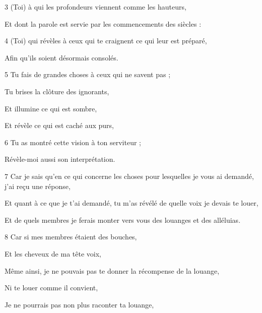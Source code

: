 \par 3 (Toi) à qui les profondeurs viennent comme les hauteurs,

\par Et dont la parole est servie par les commencements des siècles :

\par 4 (Toi) qui révèles à ceux qui te craignent ce qui leur est préparé,

\par Afin qu'ils soient désormais consolés.

\par 5 Tu fais de grandes choses à ceux qui ne savent pas ;

\par Tu brises la clôture des ignorants,

\par Et illumine ce qui est sombre,

\par Et révèle ce qui est caché aux purs,

\par [Qui dans la foi se sont soumis à toi et à ta loi.]

\par 6 Tu as montré cette vision à ton serviteur ;

\par Révèle-moi aussi son interprétation.

\par 7 Car je sais qu'en ce qui concerne les choses pour lesquelles je vous ai demandé, j'ai reçu une réponse,

\par Et quant à ce que je t'ai demandé, tu m'as révélé de quelle voix je devais te louer,

\par Et de quels membres je ferais monter vers vous des louanges et des alléluias.

\par 8 Car si mes membres étaient des bouches,

\par Et les cheveux de ma tête voix,

\par Même ainsi, je ne pouvais pas te donner la récompense de la louange,

\par Ni te louer comme il convient,

\par Je ne pourrais pas non plus raconter ta louange,

